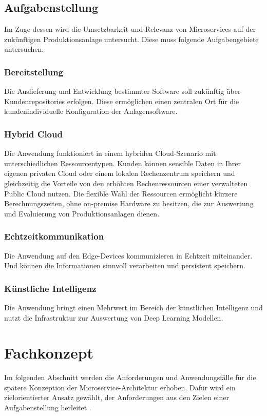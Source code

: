 \subsection{Aufgabenstellung}
Im Zuge dessen wird die Umsetzbarkeit und Relevanz von Microservices auf der zukünftigen Produktionsanlage untersucht. 
Diese muss folgende Aufgabengebiete untersuchen.


\subsubsection{Bereitstellung}
Die Auslieferung und Entwicklung bestimmter Software soll zukünftig über Kundenrepositories erfolgen. 
Diese ermöglichen einen zentralen Ort für die kundenindividuelle Konfiguration der Anlagensoftware. 

\subsubsection{Hybrid Cloud}
Die Anwendung funktioniert in einem hybriden Cloud-Szenario mit unterschiedlichen Ressourcentypen. Kunden können sensible Daten in Ihrer eigenen
privaten Cloud oder einem lokalen Rechenzentrum speichern und gleichzeitig die
Vorteile von den erhöhten Rechenressourcen einer verwalteten Public Cloud nutzen.
Die flexible Wahl der Ressourcen ermöglicht kürzere Berechnungszeiten, ohne on-premise Hardware zu besitzen, die zur Auswertung und Evaluierung von Produktionsanlagen dienen.

\subsubsection{Echtzeitkommunikation}
Die Anwendung auf den Edge-Devices kommunizieren in Echtzeit miteinander. 
Und können die Informationen sinnvoll verarbeiten und persistent speichern.

\subsubsection{Künstliche Intelligenz}
Die Anwendung bringt einen Mehrwert im Bereich der künstlichen Intelligenz und nutzt die Infrastruktur zur Auswertung von Deep Learning Modellen. 

\section{Fachkonzept}
Im folgenden Abschnitt werden die Anforderungen und Anwendungsfälle für die spätere Konzeption der Microservice-Architektur erhoben.
Dafür wird ein zielorientierter Ansatz gewählt, der Anforderungen aus den Zielen einer Aufgabenstellung herleitet \cite[S.47]{Laplante}. 

